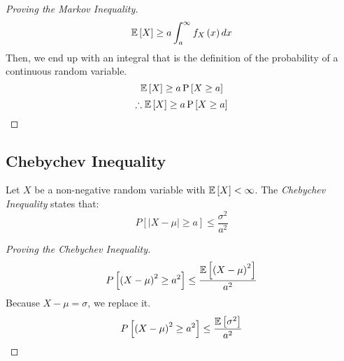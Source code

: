 \begin{proof}[Proving the Markov Inequality]
\begin{equation*}
				\operatorname{\operatorname{\mathbb{E}}} \left[ X \right] \geq a \int_{a}^{\infty} f_{X} \left( x \right) dx
			\end{equation*}
			Then, we end up with an integral that is the definition of the probability of a continuous random variable.
			\begin{equation*}
				\operatorname{\operatorname{\mathbb{E}}} \left[ X \right] \geq a \operatorname{\operatorname{P}} \left[ X \geq a \right]
			\end{equation*}
			\begin{equation*} \label{eq:Proved Markov Inequality}
				\therefore
				\operatorname{\operatorname{\mathbb{E}}} \left[ X \right] \geq a \operatorname{\operatorname{P}} \left[ X \geq a \right]
			\end{equation*}
		\end{proof}
	
	\subsection{Chebychev Inequality} \label{subsec:Chebychev Inequality}
		\begin{definition} \label{def:Chebychev Inequality}
			Let $X$ be a non-negative random variable with $\operatorname{\operatorname{\mathbb{E}}} \left[ X \right] < \infty$.
			The \emph{Chebychev Inequality} states that:
			\begin{equation} \label{eq:Chebychev Inequality}
				P \left[ \lvert X-\mu \rvert \geq a \right] \leq \frac{\sigma^{2}}{a^{2}}
			\end{equation}
			\begin{proof}[Proving the Chebychev Inequality] \label{proof:Chebychev Inequality}
				\begin{equation*}
					P \left[ \left( X-\mu \right)^{2} \geq a^{2} \right] \leq \frac{\operatorname{\operatorname{\mathbb{E}}} \left[ \left( X-\mu \right)^{2} \right]}{a^{2}}
				\end{equation*}
				Because $X-\mu = \sigma$, we replace it.
				\begin{equation*}
					P \left[ \left( X-\mu \right)^{2} \geq a^{2} \right] \leq \frac{\operatorname{\operatorname{\mathbb{E}}} \left[ \sigma^{2} \right]}{a^{2}}
				\end{equation*}
			\end{proof}
		\end{definition}